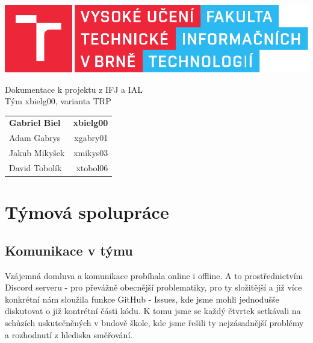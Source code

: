 \documentclass[a4paper, 12pt]{article}
\begin{document}
    \begin{titlepage}
		\centering

        \includegraphics{src/fitlogo.pdf}


        {\Huge Dokumentace k projektu z IFJ a IAL\\[0.4em]
            \LARGE Tým xbielg00, varianta TRP}


        \begin{table}[H]
            \hfill
            \begin{tabularx}{0.5\textwidth}{Xr}
                \textbf{Gabriel Biel} & \textbf{xbielg00} \\
                Adam Gabrys & xgabry01 \\
                Jakub Mikyšek & xmikys03 \\
                David Tobolík & xtobol06 \\
            \end{tabularx}
        \end{table}
	\end{titlepage}

    \tableofcontents
    \newpage

    \section{Týmová spolupráce}
        \subsection{Komunikace v týmu}
            Vzájemná domluva a komunikace probíhala online i offline. A to prostřednictvím Discord serveru - pro převážně obecnější problematiky, pro ty složitější a již více konkrétní nám sloužila funkce GitHub - Issues, kde jsme mohli jednodušše diskutovat o již kontrétní části kódu. K tomu jsme se každý čtvrtek setkávali na schůzích uskutečněných v budově škole, kde jsme řešili ty nejzásadnější problémy a rozhodnutí z hlediska směřování.
\end{document}
